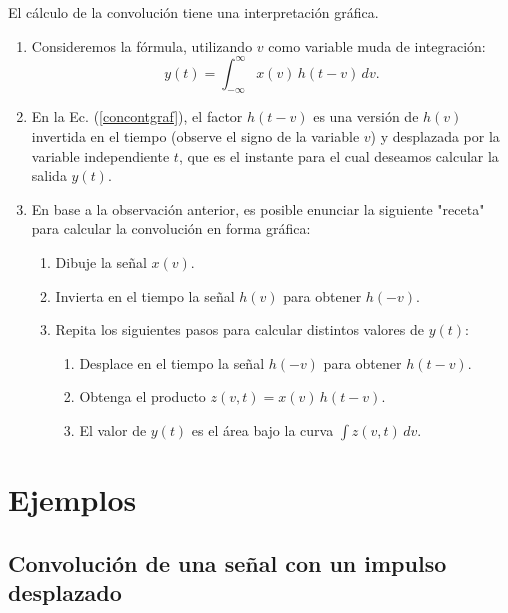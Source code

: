 \documentclass[11pt,a4paper,openany]{book}
\begin{document}
El cálculo de la convolución tiene una interpretación gráfica.
\begin{enumerate}
	\item Consideremos la fórmula, utilizando $v$ como variable muda de integración:
	\begin{equation}
		y(t) = \int_{-\infty}^{\infty} x(v) \, h(t - v) \, dv. \label{concontgraf}
	\end{equation}
	
	\item En la Ec. (\ref{concontgraf}), el factor $h(t - v)$ es una versión de $h(v)$ invertida en el tiempo (observe el signo de la variable $v$) y desplazada por la variable independiente $t$, que es el instante para el cual deseamos calcular la salida $y(t)$.
	
	\item En base a la observación anterior, es posible enunciar la siguiente "receta" para calcular la convolución en forma gráfica:
	\begin{enumerate}
		\item Dibuje la señal $x(v)$.
		\item Invierta en el tiempo la señal $h(v)$ para obtener $h(-v)$.
		\item Repita los siguientes pasos para calcular distintos valores de $y(t)$:
		\begin{enumerate}
			\item Desplace en el tiempo la señal $h(-v)$ para obtener $h(t-v)$.
			\item Obtenga el producto $z(v,t) = x(v) \, h(t - v)$.
			\item El valor de $y(t)$ es el área bajo la curva $\int z(v,t) \, dv$.
		\end{enumerate}
	\end{enumerate}
\end{enumerate}

\section{Ejemplos}

\subsection{Convolución de una señal con un impulso desplazado}
\end{document}
